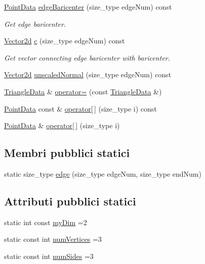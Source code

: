 \begin{DoxyCompactItemize}
\hyperlink{classPointData}{Point\-Data} \hyperlink{classTriangleData_a66a0b23811864409754be95f5c4d4793}{edge\-Baricenter} (size\-\_\-type edge\-Num) const 
\begin{DoxyCompactList}\small\item\em Get edge baricenter. \end{DoxyCompactList}\item 
\hyperlink{Core_8h_a09205951ae66bf900cc5cc57e2192667}{Vector2d} \hyperlink{classTriangleData_a4278f62058529df47e095421d02599ad}{c} (size\-\_\-type edge\-Num) const 
\begin{DoxyCompactList}\small\item\em Get vector connecting edge baricenter with baricenter. \end{DoxyCompactList}\item 
\hyperlink{Core_8h_a09205951ae66bf900cc5cc57e2192667}{Vector2d} \hyperlink{classTriangleData_a3b110e4ceb09cc5368fcecad9938a1c8}{unscaled\-Normal} (size\-\_\-type edge\-Num) const 
\item 
\hyperlink{classTriangleData}{Triangle\-Data} \& \hyperlink{classTriangleData_a60f17e960b9a70790aae6bb4e607740b}{operator=} (const \hyperlink{classTriangleData}{Triangle\-Data} \&)
\item 
\hyperlink{classPointData}{Point\-Data} const \& \hyperlink{classTriangleData_ada8cc2e9bcbf4a2fc80d2a753e32d74d}{operator\mbox{[}$\,$\mbox{]}} (size\-\_\-type i) const 
\item 
\hyperlink{classPointData}{Point\-Data} \& \hyperlink{classTriangleData_ab7d75e8ec4a88a32acc3aef2da96eb80}{operator\mbox{[}$\,$\mbox{]}} (size\-\_\-type i)
\end{DoxyCompactItemize}
\subsection*{Membri pubblici statici}
\begin{DoxyCompactItemize}
\item 
static size\-\_\-type \hyperlink{classTriangleData_a32634f5f869bda807ccde85f226fd4ff}{edge} (size\-\_\-type edge\-Num, size\-\_\-type end\-Num)
\end{DoxyCompactItemize}
\subsection*{Attributi pubblici statici}
\begin{DoxyCompactItemize}
\item 
static int const \hyperlink{classTriangleData_aba0f696d79a127708f9cd73ffaa13ec9}{my\-Dim} =2
\item 
static const int \hyperlink{classTriangleData_a30d9f452a2cab5b864084d13b7076908}{num\-Vertices} =3
\item 
static const int \hyperlink{classTriangleData_a9c499ade75343930cf6722c8e39d9485}{num\-Sides} =3
\end{DoxyCompactItemize}
